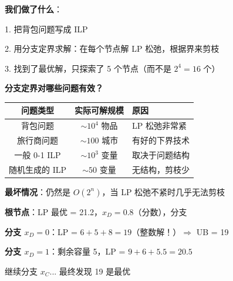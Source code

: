 \documentclass[12pt, a4paper]{ctexart}
\begin{document}
\begin{blackboard}[分支定界小结]

\textbf{我们做了什么}：

1. 把背包问题写成 ILP

2. 用分支定界求解：在每个节点解 LP 松弛，根据界来剪枝

3. 找到了最优解，只探索了 5 个节点（而不是 $2^4 = 16$ 个）

\textbf{分支定界对哪些问题有效？}

\begin{center}
\begin{tabular}{c|c|l}
问题类型 & 实际可解规模 & 原因 \\
\hline
背包问题 & $\sim 10^4$ 物品 & LP 松弛非常紧 \\
旅行商问题 & $\sim 100$ 城市 & 有好的下界技术 \\
一般 0-1 ILP & $\sim 10^3$ 变量 & 取决于问题结构 \\
随机生成的 ILP & $\sim 50$ 变量 & 无结构，剪枝少
\end{tabular}
\end{center}

\textbf{最坏情况}：仍然是 $O(2^n)$，当 LP 松弛不紧时几乎无法剪枝

\end{blackboard}

\begin{blackboard}[分支定界的执行过程]

\textbf{根节点}：LP 最优 = 21.2，$x_D = 0.8$（分数），分支

\begin{center}
\end{center}

\textbf{分支 $x_D = 0$}：LP = $6 + 5 + 8 = 19$（整数解！）$\Rightarrow$ UB = 19

\textbf{分支 $x_D = 1$}：剩余容量 5，LP = $9 + 6 + 5.5 = 20.5$

继续分支 $x_C$... 最终发现 19 是最优

\end{blackboard}
\end{document}
